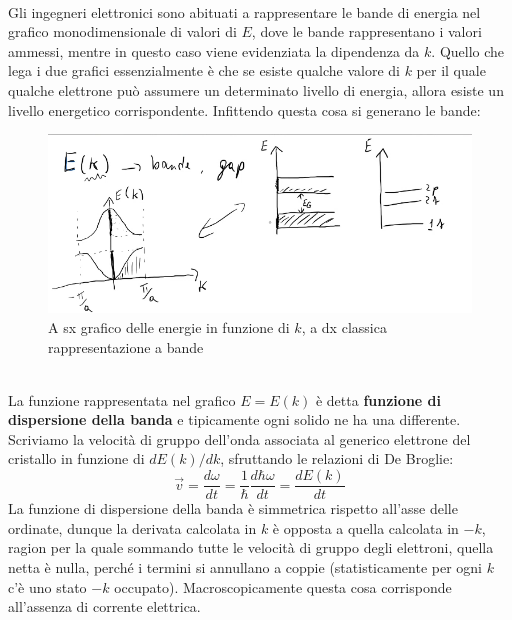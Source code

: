 \documentclass{book}
\begin{document}
                \paragraph{}
                    Gli ingegneri elettronici sono abituati a rappresentare le bande di energia nel grafico monodimensionale di valori di $E$, dove le bande rappresentano i valori ammessi, mentre in questo caso viene evidenziata la dipendenza da $k$. Quello che lega i due grafici essenzialmente è che se esiste qualche valore di $k$ per il quale qualche elettrone può assumere un determinato livello di energia, allora esiste un livello energetico corrispondente. Infittendo questa cosa si generano le bande:
                    \begin{figure}[h!]
                        \centering
                        \includegraphics[width=0.75\linewidth]{img/Lez21pt1.png}
                        \caption{A sx grafico delle energie in funzione di $k$, a dx classica rappresentazione a bande}
                        \label{fig:rappresentazioneABande}
                    \end{figure}\\
                    La funzione rappresentata nel grafico $E = E(k)$ è detta \textbf{funzione di dispersione della banda} e tipicamente ogni solido ne ha una differente.
                    Scriviamo la velocità di gruppo dell'onda associata al generico elettrone del cristallo in funzione di $dE(k)/dk$, sfruttando le relazioni di De Broglie:
                    $$\vec{v} = \frac{d \omega}{dt} = \frac{1}{\hbar} \frac{d \hbar \omega}{dt} = \frac{dE(k)}{dt}$$
                    La funzione di dispersione della banda è simmetrica rispetto all'asse delle ordinate, dunque la derivata calcolata in $k$ è opposta a quella calcolata in $-k$, ragion per la quale sommando tutte le velocità di gruppo degli elettroni, quella netta è nulla, perché i termini si annullano a coppie (statisticamente per ogni $k$ c'è uno stato $-k$ occupato). Macroscopicamente questa cosa corrisponde all'assenza di corrente elettrica.\\ \\
\end{document}
